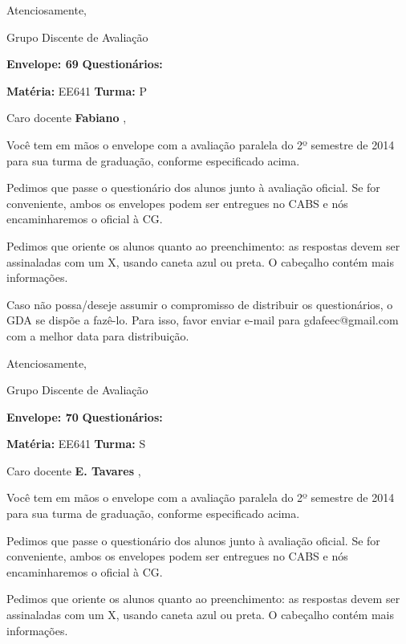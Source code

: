 \documentclass[a5paper]{letter}
\begin{document}
Atenciosamente, 

Grupo Discente de Avaliação

\vspace{0.5cm}

{\bf Envelope: 69 }		\hfill	{\bf Questionários:} \hspace{2cm}

\newpage
\thispagestyle{empty}

\hfill {\bf Matéria:} EE641 {\bf Turma:} P

Caro docente {\bf Fabiano }, 

	Você tem em mãos o envelope com a avaliação paralela do 2º semestre de 2014 para sua turma de graduação, conforme especificado acima.

	Pedimos que passe o questionário dos alunos junto à avaliação oficial. Se for conveniente, ambos os envelopes podem ser entregues no CABS e nós encaminharemos o oficial à CG.

Pedimos que oriente os alunos quanto ao preenchimento: as respostas devem ser assinaladas com um X, usando caneta azul ou preta. O cabeçalho contém mais informações.

	Caso não possa/deseje assumir o compromisso de distribuir os questionários, o GDA se dispõe a fazê-lo. Para isso, favor enviar e-mail para gdafeec@gmail.com com a melhor data para distribuição.


Atenciosamente, 

Grupo Discente de Avaliação

\vspace{0.5cm}

{\bf Envelope: 70 }		\hfill	{\bf Questionários:} \hspace{2cm}

\newpage
\thispagestyle{empty}

\hfill {\bf Matéria:} EE641 {\bf Turma:} S

Caro docente {\bf E. Tavares }, 

	Você tem em mãos o envelope com a avaliação paralela do 2º semestre de 2014 para sua turma de graduação, conforme especificado acima.

	Pedimos que passe o questionário dos alunos junto à avaliação oficial. Se for conveniente, ambos os envelopes podem ser entregues no CABS e nós encaminharemos o oficial à CG.

Pedimos que oriente os alunos quanto ao preenchimento: as respostas devem ser assinaladas com um X, usando caneta azul ou preta. O cabeçalho contém mais informações.
\end{document}
